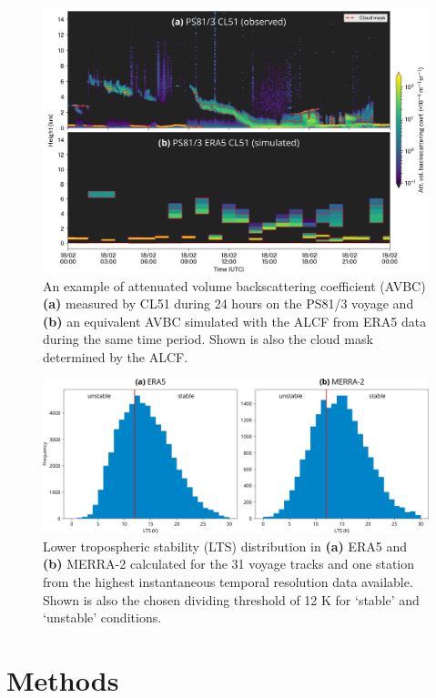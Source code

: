\documentclass[12pt,a4paper]{article}
\begin{document}
\begin{figure}
\centering
\includegraphics[width=\textwidth]{img/example.png}
\caption{
An example of attenuated volume backscattering coefficient (AVBC) \textbf{(a)}
measured by CL51 during 24 hours on the PS81/3 voyage and \textbf{(b)} an
equivalent AVBC simulated with the ALCF from ERA5 data during the same time
period. Shown is also the cloud mask determined by the ALCF.
}
\label{fig:example}
\end{figure}

\begin{figure}
\centering
\includegraphics[width=\textwidth]{img/lts_dist.pdf}
\caption{
Lower tropospheric stability (LTS) distribution in \textbf{(a)} ERA5 and
\textbf{(b)} MERRA-2 calculated for the 31 voyage tracks and one station from
the highest instantaneous temporal resolution data available. Shown is also the
chosen dividing threshold of 12 K for `stable' and `unstable' conditions.
}
\label{fig:lts}
\end{figure}

\section{Methods}
\label{sec:methods}
\end{document}

